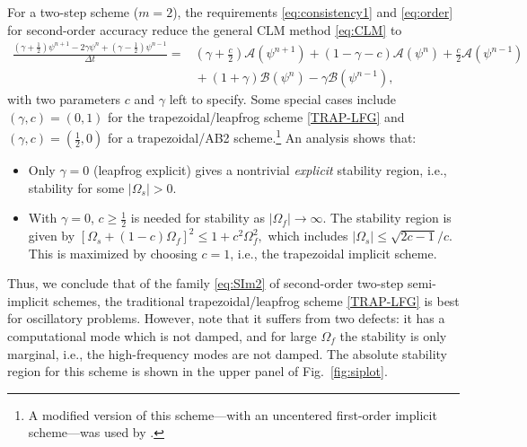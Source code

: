 \documentclass[12pt]{article}
\newcommand{\dt}{\Delta t}
\newcommand{\opA}{\mathcal{A}}
\newcommand{\opB}{\mathcal{B}}
\begin{document}
For a two-step scheme ($m=2$), the requirements \eqref{eq:consistency1} 
and \eqref{eq:order} for second-order accuracy reduce the general CLM method 
\eqref{eq:CLM} to
\begin{equation}
\begin{split}
\frac{(\gamma+\tfrac12)\psi^{n+1} - 2\gamma\psi^{n}
        + (\gamma-\tfrac12)\psi^{n-1}}{\dt} 
=& \left(\gamma+\tfrac{c}{2}\right) \opA(\psi^{n+1}) 
    + (1-\gamma-c) \opA(\psi^{n}) + \tfrac{c}{2} \opA(\psi^{n-1})
\nonumber
\\
 & {} + (1+\gamma) \opB(\psi^{n}) - \gamma \opB(\psi^{n-1}) ,
\label{eq:SIm2}
\end{split}
\end{equation}
with two parameters $c$ and $\gamma$ left to specify.
Some special cases include
$(\gamma,c)=(0,1)$ for the trapezoidal/leapfrog scheme
\eqref{TRAP-LFG} and $(\gamma,c)=(\tfrac12,0)$ for a trapezoidal/AB2 
scheme.\footnote{A modified version of this scheme---with an uncentered
first-order implicit scheme---was used by \cite{Simmons_Temperton97}.}
An analysis shows that:
{\setlength{\parskip}{0pt}
\begin{itemize}
\setlength{\itemsep}{2pt} \setlength{\parsep}{0pt}
\setlength{\topsep}{0pt} \setlength{\partopsep}{0pt}
\item Only $\gamma=0$ (leapfrog explicit) gives a nontrivial 
\emph{explicit} stability region, i.e., stability for some $|\Omega_s|>0$.
\item With $\gamma=0$, $c\ge\frac12$ is needed for stability as
$|\Omega_f|\to\infty$.  The stability region is given by
\begin{math}
    \left[\Omega_s + (1-c)\Omega_f\right]^2 \le 1+c^2\Omega_f^2 ,
\end{math}
which includes $|\Omega_s|\le\sqrt{2c-1}/c$. This is maximized by choosing
$c=1$, i.e., the trapezoidal implicit scheme.
\end{itemize}
}
\noindent
Thus, we conclude that of the family \eqref{eq:SIm2} of second-order two-step
semi-implicit schemes, the traditional trapezoidal/leapfrog scheme
\eqref{TRAP-LFG} is best for oscillatory problems.  However, note that it
suffers from two defects:  it has a computational mode which is not
damped, and for large $\Omega_f$ the stability is only marginal, i.e., the
high-frequency modes are not damped.  The absolute stability region for this
scheme is shown in the upper panel of Fig.~\ref{fig:siplot}.
\end{document}
